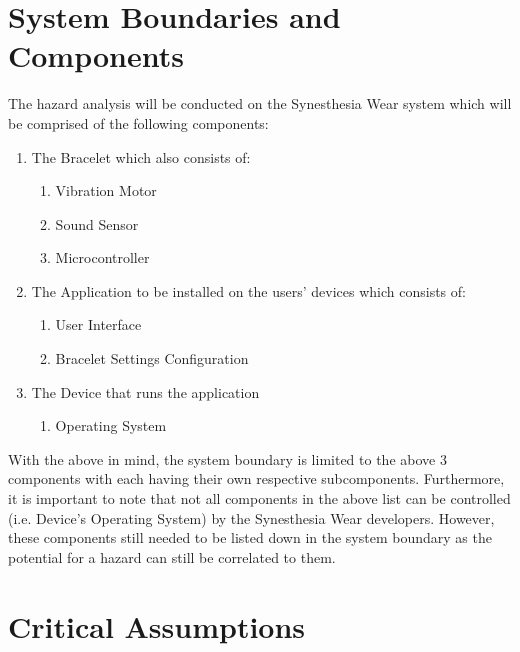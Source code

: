 \documentclass{article}
\begin{document}
\section{System Boundaries and Components}
The hazard analysis will be conducted on the Synesthesia Wear system which will be 
comprised of the following components:
\begin{enumerate}
    \item The Bracelet which also consists of:
    \begin{enumerate}
        \item Vibration Motor
        \item Sound Sensor
        \item Microcontroller
    \end{enumerate}
    \item The Application to be installed on the users' devices which consists of:
    \begin{enumerate}
        \item User Interface
        \item Bracelet Settings Configuration
    \end{enumerate}
    \item The Device that runs the application
    \begin{enumerate}
        \item Operating System
    \end{enumerate}
\end{enumerate}

With the above in mind, the system boundary is limited to the above 3 components with 
each having their own respective subcomponents. Furthermore, it is important to note 
that not all components in the above list can be controlled (i.e. Device's Operating 
System) by the Synesthesia Wear developers. However, these components still needed to 
be listed down in the system boundary as the potential for a hazard can still be 
correlated to them.

\section{Critical Assumptions}

\end{document}
